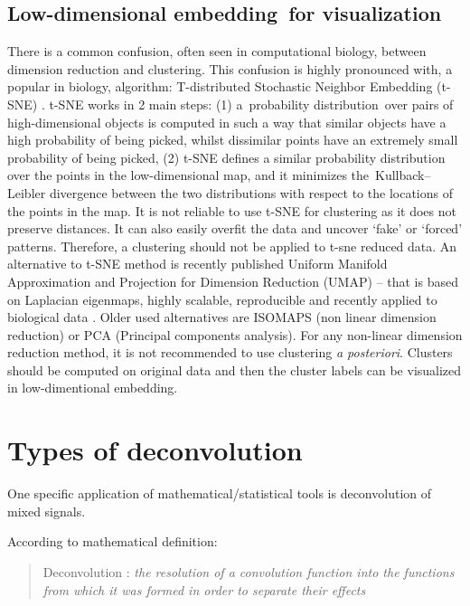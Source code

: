 \documentclass[12pt,]{book}
\theoremstyle{definition}
\theoremstyle{definition}
\theoremstyle{definition}
\theoremstyle{remark}
\begin{document}
\hypertarget{low-dimensional-embeddingfor-visualization}{%
\subsection{Low-dimensional embedding~for
visualization}\label{low-dimensional-embeddingfor-visualization}}

There is a common confusion, often seen in computational biology,
between dimension reduction and clustering. This confusion is highly
pronounced with, a popular in biology, algorithm: T-distributed
Stochastic Neighbor Embedding (t-SNE) \citep{VanDerMaaten2008}. t-SNE
works in 2 main steps: (1) a~probability distribution~over pairs of
high-dimensional objects is computed in such a way that similar objects
have a high probability of being picked, whilst dissimilar points have
an extremely small probability of being picked, (2) t-SNE defines a
similar probability distribution over the points in the low-dimensional
map, and it minimizes the~Kullback--Leibler divergence between the two
distributions with respect to the locations of the points in the map. It
is not reliable to use t-SNE for clustering as it does not preserve
distances. It can also easily overfit the data and uncover `fake' or
`forced' patterns. Therefore, a clustering should not be applied to
t-sne reduced data. An alternative to t-SNE method is recently published
Uniform Manifold Approximation and Projection for Dimension Reduction
(UMAP) \citep{Mcinnes2018}-- that is based on Laplacian eigenmaps,
highly scalable, reproducible and recently applied to biological data
\citep{Becht2018}. Older used alternatives are ISOMAPS (non linear
dimension reduction) or PCA (Principal components analysis). For any
non-linear dimension reduction method, it is not recommended to use
clustering \emph{a posteriori}. Clusters should be computed on original
data and then the cluster labels can be visualized in low-dimentional
embedding.

\hypertarget{types-of-deconvolution}{%
\section{Types of deconvolution}\label{types-of-deconvolution}}

One specific application of mathematical/statistical tools is
deconvolution of mixed signals.

According to mathematical definition:

\begin{quote}
Deconvolution : \emph{the resolution of a convolution function into the
functions from which it was formed in order to separate their effects}
\end{quote}
\end{document}

